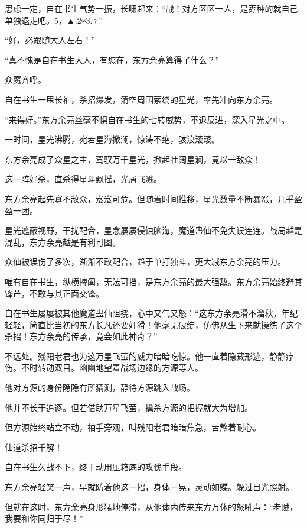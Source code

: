 
\begin{this_body}

思虑一定，自在书生气势一振，长啸起来：“战！对方区区一人，是孬种的就自己单独退走吧。5，▲.2≈3.♀”

“好，必跟随大人左右！”

“真不愧是自在书生大人，有您在，东方余亮算得了什么？”

众魔齐呼。

自在书生一甩长袖，杀招爆发，清空周围萦绕的星光，率先冲向东方余亮。

“来得好。”东方余亮丝毫不惧自在书生的七转威势，不退反进，深入星光之中。

一时间，星光沸腾，宛若星海掀澜，惊涛不绝，骇浪滚滚。

东方余亮成了众星之主，驾驭万千星光，掀起壮阔星澜，竟以一敌众！

这一阵好杀，直杀得星斗飘摇，光屑飞溅。

东方余亮起先寡不敌众，岌岌可危。但随着时间推移，星光数量不断暴涨，几乎盈盈一团。

星光遮蔽视野，干扰配合，星念屡屡侵蚀脑海，魔道蛊仙不免失误连连。战局越是混乱，东方余亮越是有利可图。

众仙被误伤了多次，渐渐不敢配合，趋于单打独斗，更大减东方余亮的压力。

唯有自在书生，纵横捭阖，无法可挡，是东方余亮的最大强敌。东方余亮始终避其锋芒，不敢与其正面交锋。

自在书生屡屡被其他魔道蛊仙阻挠，心中又气又怒：“这东方余亮滑不溜秋，年纪轻轻，简直比当初的东方长凡还要奸猾！他毫无破绽，仿佛从生下来就操练了这个杀招！东方余亮的传承，竟会如此神奇？”

不远处。残阳老君也为这万星飞萤的威力暗暗吃惊。他一直着隐藏形迹，静静疗伤。不时转动双目。幽幽地望着战场边缘的方源等人。

他对方源的身份隐隐有所猜测，静待方源跳入战场。

他并不长于追逐。但若借助万星飞萤，擒杀方源的把握就大为增加。

但方源始终站立不动，袖手旁观，叫残阳老君暗暗焦急，苦熬着耐心。

仙道杀招千解！

自在书生久战不下，终于动用压箱底的攻伐手段。

东方余亮轻笑一声，早就防着他这一招，身体一晃，灵动如蝶。躲过目光照射。

但就在这时，东方余亮身形猛地停滞，从他体内传来东方万休的怒吼声：“老贼，我要和你同归于尽！”


\end{this_body}
